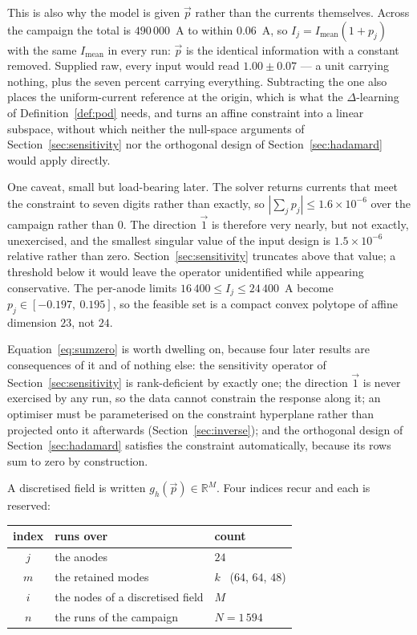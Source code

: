 \documentclass[11pt,a4paper]{article}
\newcommand{\Real}{\mathbb{R}}
\theoremstyle{plain}
\theoremstyle{definition}
\theoremstyle{remark}
\begin{document}
This is also why the model is given $\vec{p}$ rather than the currents
themselves. Across the campaign the total is $490\,000$~A to within $0.06$~A, so
$I_j = I_{\mathrm{mean}}(1+p_j)$ with the same $I_{\mathrm{mean}}$ in every run:
$\vec{p}$ is the identical information with a constant removed. Supplied raw,
every input would read $1.00 \pm 0.07$ --- a unit carrying nothing, plus the
seven percent carrying everything. Subtracting the one also places the
uniform-current reference at the origin, which is what the $\Delta$-learning of
Definition~\ref{def:pod} needs, and turns an affine constraint into a linear
subspace, without which neither the null-space arguments of
Section~\ref{sec:sensitivity} nor the orthogonal design of
Section~\ref{sec:hadamard} would apply directly.

One caveat, small but load-bearing later. The solver returns currents that meet
the constraint to seven digits rather than exactly, so
$|\sum_j p_j| \le 1.6\times10^{-6}$ over the campaign rather than $0$. The
direction $\vec{1}$ is therefore very nearly, but not exactly, unexercised, and
the smallest singular value of the input design is $1.5\times10^{-6}$ relative
rather than zero. Section~\ref{sec:sensitivity} truncates above that value; a
threshold below it would leave the operator unidentified while appearing
conservative. The per-anode limits
$16\,400 \le I_j \le 24\,400$~A become $p_j \in [-0.197,\ 0.195]$, so the
feasible set is a compact convex polytope of affine dimension $23$, not $24$.

Equation~\eqref{eq:sumzero} is worth dwelling on, because four later results are
consequences of it and of nothing else: the sensitivity operator of
Section~\ref{sec:sensitivity} is rank-deficient by exactly one; the direction
$\vec{1}$ is never exercised by any run, so the data cannot constrain the
response along it; an optimiser must be parameterised on the constraint
hyperplane rather than projected onto it afterwards
(Section~\ref{sec:inverse}); and the orthogonal design of
Section~\ref{sec:hadamard} satisfies the constraint automatically, because its
rows sum to zero by construction.

A discretised field is written $g_h(\vec{p}) \in \Real^{M}$. Four indices recur
and each is reserved:

\begin{center}
\small
\begin{tabular}{@{}cll@{}}
\toprule
index & runs over & count \\
\midrule
$j$ & the anodes                    & $24$ \\
$m$ & the retained modes            & $k$ \ ($64$, $64$, $48$) \\
$i$ & the nodes of a discretised field & $M$ \\
$n$ & the runs of the campaign      & $N = 1\,594$ \\
\bottomrule
\end{tabular}
\end{center}
\end{document}
